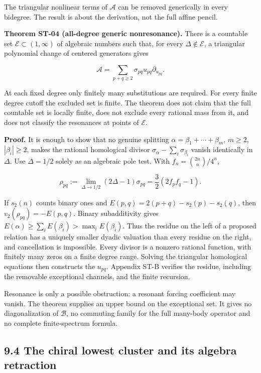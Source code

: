 \documentclass[a4paper,11pt]{article}
\numberwithin{equation}{section}
\begin{document}
The triangular nonlinear terms of \(\mathscr A\) can be removed generically in every bidegree. The result is about the derivation, not the full affine pencil.

\textbf{Theorem ST-04 (all-degree generic nonresonance).} There is a countable set \(\mathcal E\subset(1,\infty)\) of algebraic numbers such that, for every \(\Delta\notin\mathcal E\), a triangular polynomial change of centered generators gives

\[
\mathscr A=\sum_{p+q\geq2}\sigma_{pq}u_{pq}\partial_{u_{pq}}.
\]

At each fixed degree only finitely many substitutions are required. For every finite degree cutoff the excluded set is finite. The theorem does not claim that the full countable set is locally finite, does not exclude every rational mass from it, and does not classify the resonances at points of \(\mathcal E\).

\textbf{Proof.} It is enough to show that no genuine splitting \(\alpha=\beta_1+\cdots+\beta_m\), \(m\geq2\), \(|\beta_i|\geq2\), makes the rational homological divisor \(\sigma_\alpha-\sum_i\sigma_{\beta_i}\) vanish identically in \(\Delta\). Use \(\Delta=1/2\) solely as an algebraic pole test. With \(f_n=\binom{2n}{n}/4^n\),

\[
\rho_{pq}:=\lim_{\Delta\to1/2}(2\Delta-1)\sigma_{pq}
=\frac32(2f_pf_q-1).
\]

If \(s_2(n)\) counts binary ones and \(E(p,q)=2(p+q)-s_2(p)-s_2(q)\), then \(v_2(\rho_{pq})=-E(p,q)\). Binary subadditivity gives \(E(\alpha)\geq\sum_iE(\beta_i)>\max_iE(\beta_i)\). Thus the residue on the left of a proposed relation has a uniquely smaller dyadic valuation than every residue on the right, and cancellation is impossible. Every divisor is a nonzero rational function, with finitely many zeros on a finite degree range. Solving the triangular homological equations then constructs the \(u_{pq}\). Appendix ST-B verifies the residue, including the removable exceptional channels, and the finite recursion.

Resonance is only a possible obstruction: a resonant forcing coefficient may vanish. The theorem supplies an upper bound on the exceptional set. It gives no diagonalization of \(\mathscr B\), no commuting family for the full many-body operator and no complete finite-spectrum formula.

\hypertarget{the-chiral-lowest-cluster-and-its-algebra-retraction}{%
\subsection{9.4 The chiral lowest cluster and its algebra retraction}\label{the-chiral-lowest-cluster-and-its-algebra-retraction}}
\end{document}
